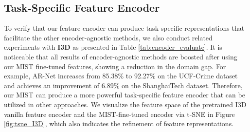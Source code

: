 \documentclass[final]{cvpr}
\newcommand{\ftst}{\textcolor[rgb]{0,0, 0}}
\newcommand{\ftnd}{\textcolor[rgb]{0.,0,0}}
\newcommand{\jcst}{\textcolor[rgb]{0,0,0}}
\newcommand{\jcgam}{\textcolor[rgb]{0.,0.,0}}
\begin{document}
\vspace{-0.1cm}
\subsection{Task-Specific Feature Encoder}
\vspace{-0.2cm}
\ftst{To verify that \ftnd{our} feature encoder can produce task-specific representations that facilitate the other encoder-agnostic methods, we also conduct related experiments with  \jcst{\textbf{I3D}} as presented in Table \ref{tab:encoder_evaluate}.
It is noticeable that all results of encoder-agnostic methods are boosted after using our MIST fine-tuned features,
\jcgam{showing a reduction in the domain gap}. 
For example, AR-Net \cite{wan2020weakly} increases from 85.38\% to 92.27\% on the UCF-Crime dataset and achieves an improvement of 6.89\% on the ShanghaiTech dataset. Therefore, our MIST can produce a more powerful \ftnd{task-specific} feature encoder that can be utilized in other approaches. We visualize the feature space of the pretrained I3D vanilla feature encoder and the MIST-fine-tuned encoder via t-SNE\cite{maaten2008visualizing} in Figure \ref{fig:tsne_I3D}, which also indicates the refinement of feature representations.}
\end{document}
